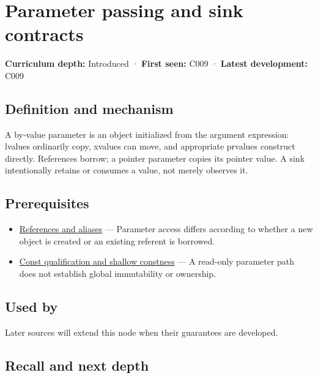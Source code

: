 \hypertarget{appendix-d5908f75721f}{}\label{referencestart:appendix-d5908f75721f}
\section{Parameter passing and sink contracts}\label{appendix-d5908f75721f-parameter-passing-and-sink-contracts}

\textbf{Curriculum depth:} Introduced · \textbf{First seen:} C009 · \textbf{Latest development:} C009

\subsection{Definition and mechanism}\label{appendix-d5908f75721f-definition-and-mechanism}

A by-value parameter is an object initialized from the argument expression: lvalues ordinarily copy, xvalues can move, and appropriate prvalues construct directly. References borrow; a pointer parameter copies its pointer value. A sink intentionally retains or consumes a value, not merely observes it.

\subsection{Prerequisites}\label{appendix-d5908f75721f-prerequisites}

\begin{itemize}
\tightlist
\item
  \hyperref[appendix-d6d562ca9fbb]{References and aliases} --- Parameter access differs according to whether a new object is created or an existing referent is borrowed.
\item
  \hyperref[appendix-c25d60fed375]{Const qualification and shallow constness} --- A read-only parameter path does not establish global immutability or ownership.
\end{itemize}

\subsection{Used by}\label{appendix-d5908f75721f-used-by}

Later sources will extend this node when their guarantees are developed.

\subsection{Recall and next depth}\label{appendix-d5908f75721f-recall-and-next-depth}

